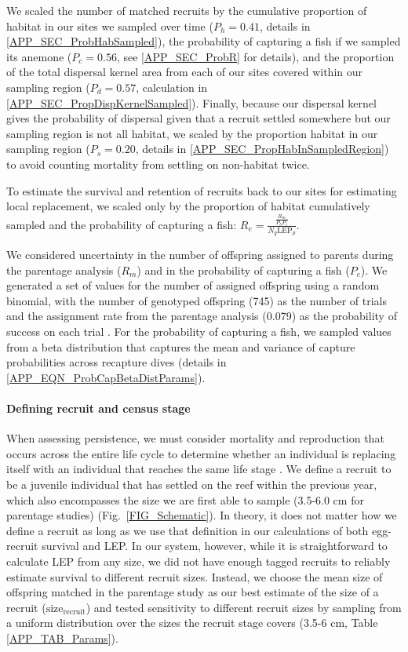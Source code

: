\documentclass[12pt, oneside]{article}   	%
\begin{document}
We scaled the number of matched recruits by the cumulative proportion of habitat in our sites we sampled over time ($P_h = 0.41$, details in \ref{APP_SEC_ProbHabSampled}),
the probability of capturing a fish if we sampled its anemone ($P_c = 0.56$, see \ref{APP_SEC_ProbR} for details), and the proportion of the total dispersal kernel area from each of our sites covered within our sampling region ($P_d =0.57$, calculation in \ref{APP_SEC_PropDispKernelSampled}). Finally, because our dispersal kernel gives the probability of dispersal given that a recruit settled somewhere but our sampling region is not all habitat, we scaled by the proportion habitat in our sampling region ($P_s = 0.20$, details in \ref{APP_SEC_PropHabInSampledRegion}) to avoid counting mortality from settling on non-habitat twice. %

To estimate the survival and retention of recruits back to our sites for estimating local replacement, we scaled only by the proportion of habitat cumulatively sampled and the probability of capturing a fish: $R_e = \frac{\frac{R_m}{P_h P_c}}{N_g \text{LEP}_p}$.

We considered uncertainty in the number of offspring assigned to parents during the parentage analysis ($R_m$) and in the probability of capturing a fish ($P_c$). We generated a set of values for the number of assigned offspring using a random binomial, with the number of genotyped offspring (745) as the number of trials and the assignment rate from the parentage analysis (0.079) as the probability of success on each trial \citep{catalanoInPrepconnectivity}. For the probability of capturing a fish, we sampled values from a beta distribution that captures the mean and variance of capture probabilities across recapture dives (details in \ref{APP_EQN_ProbCapBetaDistParams}).

\paragraph*{Defining recruit and census stage} 

When assessing persistence, we must consider mortality and reproduction that occurs across the entire life cycle to determine whether an individual is replacing itself with an individual that reaches the same life stage \citep{burgess2014beyond}. We define a recruit to be a juvenile individual that has settled on the reef within the previous year, which also encompasses the size we are first able to sample (3.5-6.0 cm for parentage studies) (Fig.\ \ref{FIG_Schematic}). In theory, it does not matter how we define a recruit as long as we use that definition in our calculations of both egg-recruit survival and LEP. In our system, however, while it is straightforward to calculate LEP from any size, we did not have enough tagged recruits to reliably estimate survival to different recruit sizes. Instead, we choose the mean size of offspring matched in the parentage study as our best estimate of the size of a recruit ($\text{size}_\text{recruit}$) and tested sensitivity to different recruit sizes by sampling from a uniform distribution over the sizes the recruit stage covers (3.5-6 cm, Table \ref{APP_TAB_Params}).
\end{document}
